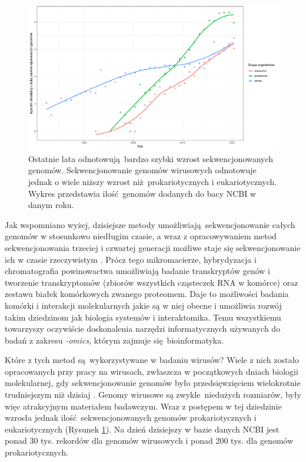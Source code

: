 \documentclass[two column, twoside, a4paper]{article}
\begin{document}
\begin{figure}[h]
\begin{tcolorbox}
	\centering
	\includegraphics[width=\textwidth]{./sequenced_genomes.pdf}
	\caption{Ostatnie lata odnotowują bardzo szybki wzrost sekwencjonowanych genomów. Sekwencjonowanie genomów wirusowych odnotowuje jednak o wiele niższy wzrost niż prokariotycznych i eukariotycznych. Wykres przedstawia ilość genomów dodanych do bacy NCBI \autocite{NCBI} w danym roku.}\label{fig::seq_trends}

\end{tcolorbox}
\end{figure}

Jak wspomniano wyżej, dzisiejsze metody umożliwiają sekwencjonowanie całych genomów w stosunkowo niedługim czasie, a wraz z opracowywaniem metod sekwencjonowania trzeciej i czwartej generacji możliwe staje się sekwencjonowanie ich w czasie rzeczywistym \autocite{Brown2019}. Prócz tego mikromacierze, hybrydyzacja i chromatografia powinowactwa umożliwiają badanie transkryptów genów i tworzenie transkryptomów (zbiorów wszystkich cząsteczek RNA w komórce) oraz zestawu białek komórkowych zwanego proteomem. Daje to możliwości badania komórki i interakcji molekularnych jakie są w niej obecne i umożliwia rozwój takim dziedzinom jak biologia systemów i interaktomika. Temu wszystkiemu towarzyszy oczywiście doskonalenia narzędzi informatycznych używanych do badań z zakresu \textit{-omics}, którym zajmuje się bioinformatyka.

Które z tych metod są wykorzystywane w badaniu wirusów? Wiele z nich zostało opracowanych przy pracy na wirusach, zwłaszcza w początkowych dniach biologii molekularnej, gdy sekwencjonowanie genomów było przedsięwzięciem wielokrotnie trudniejszym niż dzisiaj \autocite{Sanger1978}. Genomy wirusowe są zwykle niedużych rozmiarów, były więc atrakcyjnym materiałem badawczym. Wraz z postępem w tej dziedzinie wzrosła jednak ilość sekwencjonowanych genomów prokariotycznych i eukariotycznych (Rysunek \ref{fig::seq_trends}). Na dzień dzisiejszy w bazie danych NCBI jest ponad 30 tys. rekordów dla genomów wirusowych i ponad 200 tys. dla genomów prokariotycznych.
\end{document}
